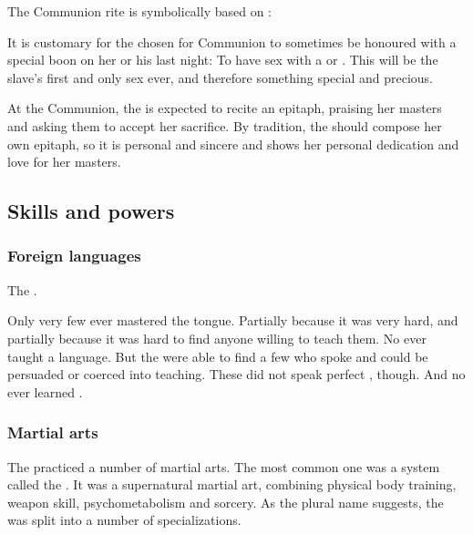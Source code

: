 The Communion rite is symbolically based on : 

It is customary for the \naor{} chosen for Communion to sometimes be honoured with a special boon on her or his last night: 
To have sex with a \resphan{} or \resvil. 
This will be the slave's first and only sex ever, and therefore something special and precious.  

At the Communion, the \naor{} is expected to recite an epitaph, praising her masters and asking them to accept her sacrifice. 
By tradition, the \naor{} should compose her own epitaph, so it is personal and sincere and shows her personal dedication and love for her masters. 









\subsection{Skills and powers}





\subsubsection{Foreign languages}
The \resphain {}. 

Only very few \resphain ever mastered the \Draconic tongue. 
Partially because it was very hard, and partially because it was hard to find anyone willing to teach them. 
No \dragon ever taught a \resphan language. 
But the \resphain were able to find a few \quiljaaran who spoke \Draconic and could be persuaded or coerced into teaching. 
These \quiljaaran did not speak perfect \Draconic, though. 
And no \resphan ever learned \TrueDraconic. 






\subsubsection{Martial arts}
The \resphain{} practiced a number of martial arts. 
The most common one was a system called the . 
It was a supernatural martial art, combining physical body training, weapon skill, psychometabolism and sorcery. 
As the plural name suggests, the  was split into a number of specializations.

